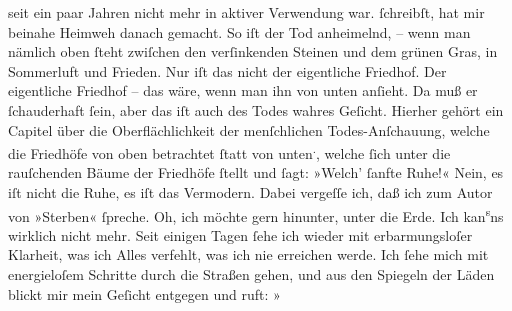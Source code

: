 \begin{ledgroupsized}[t]{13cm}
{{{                  seit ein paar Jahren nicht mehr in aktiver Verwendung war.}}}\label{K_L02739-2h} ſchreibſt, hat
               mir beinahe Heimweh danach gemacht. So iſt der Tod anheimelnd, – wenn man nämlich
               oben ſteht zwiſchen den verſinkenden Steinen und dem grünen Gras, in Sommerluft und
               Frieden. Nur iſt das nicht der eigentliche Friedhof. Der eigentliche {\pb}Friedhof – das wäre, wenn man ihn von unten anſieht.
               Da muß er ſchauderhaft ſein, aber das  iſt auch des Todes wahres Geſicht. Hierher gehört ein Capitel über die
               Oberflächlichkeit der menſchlichen Todes-Anſchauung, welche die Friedhöfe von oben
               betrachtet ſtatt von unten\substVorne{}\textsuperscript{.}\substDazwischen{},\substHinten{} welche ſich unter die  rauſchenden Bäume der Friedhöfe ſtellt und ſagt: {\pb}»Welch’ ſanfte Ruhe!« Nein, es iſt nicht die Ruhe,
               es iſt das Vermodern. \pend
           \pstart
           Dabei vergeſſe ich, daß ich zum Autor von »Sterben« ſpreche.\pend
           \pstart
            Oh, ich möchte gern  hinunter, unter die Erde. Ich kan\substVorne{}\textsuperscript{s}\substDazwischen{}ns\substHinten{} wirklich nicht mehr. Seit einigen Tagen ſehe ich wieder mit erbarmungsloſer
               Klarheit, was ich Alles verfehlt, was {\pb}ich nie
               erreichen werde. Ich ſehe mich mit energieloſem Schritte durch die Straßen gehen, und
               aus den Spiegeln der Läden blickt mir mein Geſicht entgegen und ruft: »\label{K_L02739-3v}
\end{ledgroupsized}
